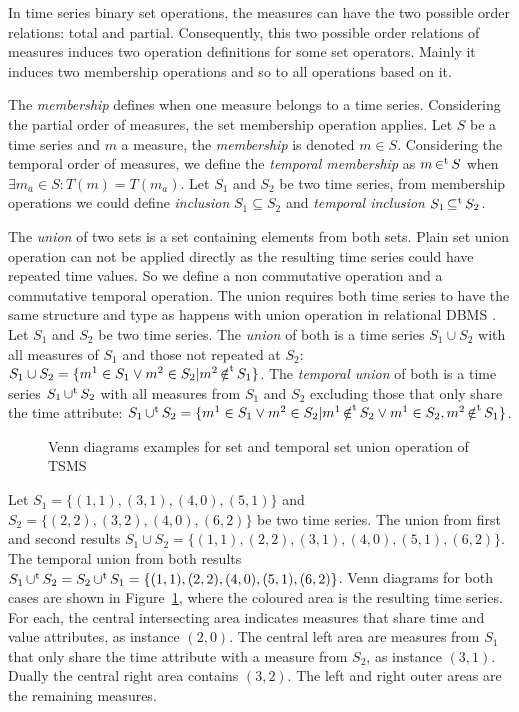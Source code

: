 In time series binary set operations, the measures can have the
two possible order relations: total and partial. Consequently, this two
possible order relations of measures induces two operation definitions
for some set operators.  Mainly it induces two membership operations
and so to all operations based on it. 


The \emph{membership} defines when one measure belongs to a time
series. Considering the partial order of measures, the set
membership operation applies. Let $S$ be a time series and $m$ a
measure, the \emph{membership} is denoted $m \in S$. Considering the
temporal order of measures, we define the \emph{temporal membership}
as $m \operatorname*{\in^t} S$ when $\exists m_a \in S : T(m) = T(m_a)$.  Let $S_1$
and $S_2$ be two time series, from membership operations we could
define \emph{inclusion} $S_1\subseteq S_2$ and \emph{temporal
  inclusion} $S_1\operatorname*{\subseteq^t} S_2$.


The \emph{union} of two sets is a set containing elements from both
sets. Plain set union operation can not be applied directly as the
resulting time series could have repeated time values.  So we define a
non commutative operation and a commutative temporal operation. The
union requires both time series to have the same structure and type as
happens with union operation in relational DBMS
\cite{date:introduction}. %
Let $S_1$ and $S_2$ be two time series. The \emph{union} of both is a
time series $S_1 \cup S_2$ with all measures of $S_1$ and those not
repeated at $S_2$: $S_1 \cup S_2 = \{m^1 \in S_1 \vee m^2 \in S_2 |
m^2 \operatorname*{\notin^t} S_1 \}$. The \emph{temporal union} of both is a time
series $S_1 \operatorname*{\cup^t} S_2$ with all measures from $S_1$ and $S_2$
excluding those that only share the time attribute: $S_1 \operatorname*{\cup^t} S_2 =
\{ m^1 \in S_1 \vee m^2 \in S_2 | m^1 \operatorname*{\notin^t} S_2 \vee m^1 \in S_2,
m^2 \operatorname*{\notin^t} S_1 \}$.


\begin{figure}
  \centering
  
  \caption{Venn diagrams examples for set and temporal set union
    operation of TSMS}
  \label{fig:model:venn}
\end{figure}


\begin{example}
  Let $S_1=\{(1,1),(3,1),(4,0),(5,1)\}$ and $S_2=\{(2,2),\allowbreak
  (3,2),(4,0),(6,2)\}$ be two time series. The union from first and
  second results $S_1 \cup S_2 = \{(1,1),(2,2),\allowbreak
  (3,1),\allowbreak (4,0),\allowbreak (5,1),(6,2)\}$. The temporal
  union from both results $S_1 \operatorname*{\cup^t} S_2 = S_2 \operatorname*{\cup^t} S_1 =
  \{(1,1),(2,2),(4,0),(5,1),\allowbreak (6,2)\}$. %
  \linebreak[4] Venn diagrams for both cases are shown in
  Figure~\ref{fig:model:venn}, where the coloured area is the
  resulting time series. For each, the central intersecting area
  indicates measures that share time and value attributes, as instance
  $(2,0)$. The central left area are measures from $S_1$ that only
  share the time attribute with a measure from $S_2$, as instance
  $(3,1)$. Dually the central right area contains $(3,2)$. The left
  and right outer areas are the remaining measures.
 \end{example}




